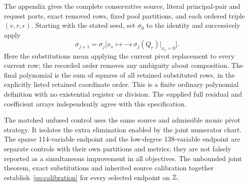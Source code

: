 The appendix gives the complete conservative source, literal principal-pair
and request ports, exact removed rows, fixed pool partitions, and each
ordered triple $(v,r,\epsilon)$. Starting with the stated seed, set
$\sigma_0$ to the identity and successively apply
\[
 \sigma_{j+1}=\sigma_j
 \bigl[x_v\mapsto-\epsilon\,\sigma_j(Q_r)|_{x_v=0}\bigr].
\]
Here the substitutions mean applying the current pivot replacement to every
current row; the recorded order removes any ambiguity about composition.
The final polynomial is the sum of squares of all retained substituted
rows, in the explicitly listed retained coordinate order. This is a finite
ordinary polynomial definition with no existential register or division.
The supplied full residual and coefficient arrays independently agree with
this specification.

The matched unfused control uses the same source and admissible monic pivot
strategy. It isolates the extra elimination enabled by the joint numerator
chart. The sparse 114-variable endpoint and the low-degree 138-variable
endpoint are separate controls with their own partitions and metrics; they
are not falsely reported as a simultaneous improvement in all objectives.
The unbounded joint theorem, exact substitutions and inherited source
calibration together establish~\eqref{eq:calibration} for every selected
endpoint on $\mathbb Z$.
